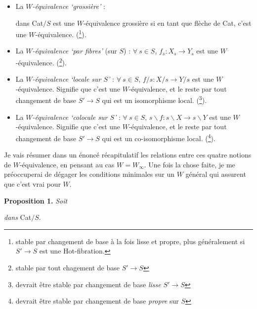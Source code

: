 \begin{itemize}
\item[a)] La \textit{$W$-équivalence ‘grossière’} :  dans Cat$/S$ est une $W$-équivalence grossière si en tant que flèche de Cat, c'est une $W$-équivalence. (\footnote[17]{stable par changement de base à la fois lisse et propre, plus généralement si $S' \longrightarrow S$ est une Hot-fibration.}).

\item[b)] La \textit{$W$-équivalence ‘par fibres’} (sur $S$) : $\forall\ s \in S$, $f_s : X_s \longrightarrow Y_s$ est une $W$-équivalence. (\footnote[18]{stable par tout chagement de base $S' \longrightarrow S$}). %

\item[c)] La \textit{$W$-équivalence ‘locale sur $S$’} : $\forall\ s \in S$, $f/s : X/s \longrightarrow Y/s$ est une $W$-équivalence. Signifie que c'est une $W$-équivalence, et le reste par tout changement de base $S' \longrightarrow S$ qui est un isomorphisme local. (\footnote[19]{devrait être stable par changement de base \textit{lisse} $S' \longrightarrow S$}).

\item[c$'$)] La \textit{$W$-équivalence ‘colocale sur $S$’} : $\forall\ s \in S$, $s\backslash f : s\backslash X \longrightarrow s\backslash Y$ est une $W$-équivalence. Signifie que c'est une $W$-équivalence, et le reste par tout changement de base $S' \longrightarrow S$ qui est un co-isomorphisme local. (\footnote[20]{devrait être stable par changement de base \textit{propre} sur $S$}).
\end{itemize}

Je vais résumer dans un énoncé récapitulatif les relations entre ces quatre notions de $W$-équivalence, en pensant au cas $W = W_\infty$. Une fois la chose faite, je me préoccuperai de dégager les conditions minimales sur un $W$ général qui assurent que c'est vrai pour $W$.

\textbf{Proposition 1.} \textit{Soit}  \textit{dans} Cat$/S$.

